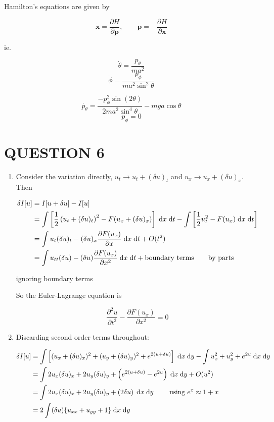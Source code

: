 \documentclass[a4paper]{article}
\begin{document}
Hamilton's equations are given by

\[ \dot{\mathbf{x}} = \frac{\partial H }{\partial \mathbf{p}}, \qquad \dot{\mathbf{p}} = - \frac{\partial H }{\partial \mathbf{x}}   \]

ie.

\[ \dot{\theta}  = \frac{p_{\theta}}{ma^{2}} \]
\[ \dot{\phi}  = \frac{p_{\phi}}{ma^{2} \sin^{2} \theta } \]

\[ \dot{p_{\theta}} = \frac{-p_{\phi}^{2} \sin(2\theta) }{2 ma^{2} \sin^{4} \theta}  - mga \cos \theta \]
\[ \dot{p_{\phi}} = 0 \]

\section{QUESTION 6}

\begin{enumerate}
	\item Consider the variation directly, $ u_{t} \to u_{t} + (\delta u)_{t} $ and $ u_{x} \to u_{x} + (\delta u)_{x} $. Then
	
	\begin{align*}
	\delta I[u] & = I[u + \delta u] - I[u] \\
	& = \int \left[ \frac{1}{2}\left(  u_{t} + (\delta u)_{t} \right)^{2} - F(u_{x} + (\delta u)_{x}) \right]  \; \mathrm{d} x \; \mathrm{d} t - \int \left[  \frac{1}{2} u_{t}^{2} - F(u_{x}) \; \mathrm{d} x \; \mathrm{d} t    \right]\\
	& = \int u_{t} (\delta u)_{t} - (\delta u)_{x} \frac{\partial F(u_{x}) }{\partial x} \; \mathrm{d} x \; \mathrm{d} t +   O(t^{2}) \\
	& = \int u_{tt} (\delta u) - (\delta u) \frac{\partial F(u_{x})  }{\partial x^{2}}\; \mathrm{d} x \; \mathrm{d} t + \text{boundary terms} \qquad \text{by parts}
	\end{align*}
	
	ignoring boundary terms
	
	So the Euler-Lagrange equation is 
	
	\[ \frac{\partial^{2} u}{\partial t^{2}} - \frac{\partial F(u_{x}) }{\partial x^{2}} = 0  \]
	
	\item 
	
	Discarding second order terms throughout:
	
	\begin{align*}
	\delta I[u] & = \int \left[ (u_{x} + (\delta u)_{x})^{2} + (  u_{y} + (\delta u)_{y} )^{2} + e^{2(u + \delta u)}  \right] \; \mathrm{d} x \; \mathrm{d} y - \int u_{x}^{2} + u_{y}^{2} + e^{2u} \; \mathrm{d} x \; \mathrm{d} y   \\
	& = \int 2 u_{x} (\delta u)_{x} + 2 u_{y} ( \delta u)_{y} + \left(  e^{2(u + \delta u)} - e^{2u} \right) \; \mathrm{d} x \; \mathrm{d} y + O(u^{2}) \\
	& = \int 2 u_{x} (\delta u)_{x} + 2 u_{y} ( \delta u)_{y} + \left( 2 \delta u  \right) \; \mathrm{d} x \; \mathrm{d} y  \qquad \text{ using } e^{x} \approx 1 + x\\
	& = 2 \int (\delta u) \{ u_{xx} + u_{yy}  + 1 \} \; \mathrm{d} x \; \mathrm{d} y
	\end{align*}
	

\end{enumerate}
\end{document}
